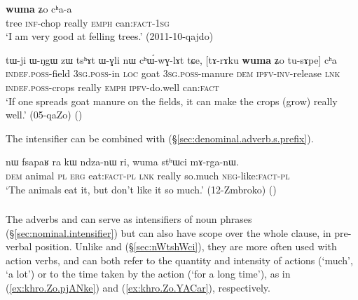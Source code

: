 \begin{exe}
\ex \label{ex:wuma.Zo.chaa}
\gll [si kɤ-pʰaʁ] \textbf{wuma} ʑo cʰa-a \\
tree \textsc{inf}-chop really \textsc{emph} can:\textsc{fact}-\textsc{1sg} \\
\glt `I am very good at felling trees.' (2011-10-qajdo)
\end{exe}

\begin{exe}
\ex \label{ex:wuma.tusApe.cha}
\gll tɯ-ji ɯ-ŋgɯ zɯ tsʰɤt ɯ-ɣli nɯ cʰɯ́-wɣ-lɤt tɕe, [tɤ-rɤku \textbf{wuma} ʑo tu-sɤpe] cʰa \\
\textsc{indef}.\textsc{poss}-field \textsc{3sg}.\textsc{poss}-in \textsc{loc} goat \textsc{3sg}.\textsc{poss}-manure \textsc{dem} \textsc{ipfv}-\textsc{inv}-release \textsc{lnk} \textsc{indef}.\textsc{poss}-crops really \textsc{emph} \textsc{ipfv}-do.well can:\textsc{fact} \\
\glt `If one spreads goat manure on the fields, it can make the crops (grow) really well.' (05-qaZo)
()
\end{exe}

The intensifier  can be combined with  (§\ref{sec:denominal.adverb.s.prefix}).  

\begin{exe}
\ex \label{ex:wuma.sthWci}
\gll nɯ fsapaʁ ra kɯ ndza-nɯ ri, wuma stʰɯci mɤ-rga-nɯ. \\
\textsc{dem} animal \textsc{pl} \textsc{erg} eat:\textsc{fact}-\textsc{pl} \textsc{lnk} really so.much \textsc{neg}-like:\textsc{fact}-\textsc{pl} \\
\glt `The animals eat it, but don't like it so much.' (12-Zmbroko)
()
\end{exe}
 
\subsubsection{} \label{sec:khro}
The adverbs  and  can serve as intensifiers of noun phrases (§\ref{sec:nominal.intensifier}) but can also have scope over the whole clause, in pre-verbal position. Unlike  and  (§\ref{sec:nWtshWci}), they are more often used with action verbs, and can both refer to the quantity and intensity of actions (`much', `a lot') or to the time taken by the action (`for a long time'), as in (\ref{ex:khro.Zo.pjANke}) and (\ref{ex:khro.Zo.YACar}), respectively.


